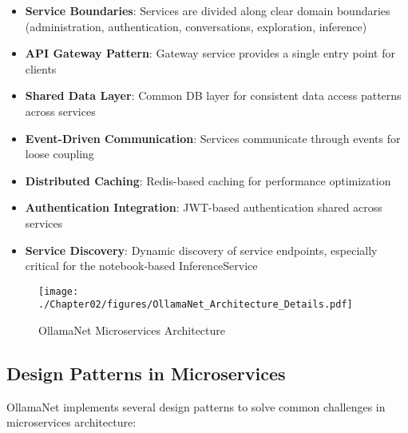 \begin{itemize}
    \item \textbf{Service Boundaries}: Services are divided along clear domain boundaries (administration, authentication, conversations, exploration, inference)
    \item \textbf{API Gateway Pattern}: Gateway service provides a single entry point for clients
    \item \textbf{Shared Data Layer}: Common DB layer for consistent data access patterns across services
    \item \textbf{Event-Driven Communication}: Services communicate through events for loose coupling
    \item \textbf{Distributed Caching}: Redis-based caching for performance optimization
    \item \textbf{Authentication Integration}: JWT-based authentication shared across services
    \item \textbf{Service Discovery}: Dynamic discovery of service endpoints, especially critical for the notebook-based InferenceService
\end{itemize}

\begin{sidewaysfigure}[p]
    \centering
    \texttt{[image: ./Chapter02/figures/OllamaNet\_Architecture\_Details.pdf]}
    \caption{OllamaNet Microservices Architecture}
    \label{fig:ollamanet-arch-details}
\end{sidewaysfigure}
\clearpage

\subsection{Design Patterns in Microservices}

OllamaNet implements several design patterns to solve common challenges in microservices architecture:

